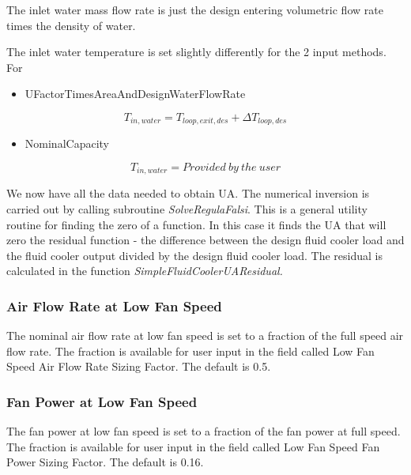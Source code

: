 The inlet water mass flow rate is just the design entering volumetric flow rate times the density of water.

The inlet water temperature is set slightly differently for the 2 input methods. For

\begin{itemize}
\tightlist
\item
  UFactorTimesAreaAndDesignWaterFlowRate
\end{itemize}

\begin{equation}
{T_{in,water}} = {T_{loop,exit,des}} + \Delta {T_{loop,des}}
\end{equation}

\begin{itemize}
\tightlist
\item
  NominalCapacity
\end{itemize}

\begin{equation}
{T_{in,water}} = Provided~by~the~user
\end{equation}

We now have all the data needed to obtain UA. The numerical inversion is carried out by calling subroutine \emph{SolveRegulaFalsi}. This is a general utility routine for finding the zero of a function. In this case it finds the UA that will zero the residual function - the difference between the design fluid cooler load and the fluid cooler output divided by the design fluid cooler load. The residual is calculated in the function \emph{SimpleFluidCoolerUAResidual.}

\subsubsection{Air Flow Rate at Low Fan Speed}\label{air-flow-rate-at-low-fan-speed-1}

The nominal air flow rate at low fan speed is set to a fraction of the full speed air flow rate. The fraction is available for user input in the field called Low Fan Speed Air Flow Rate Sizing Factor. The default is 0.5.

\subsubsection{Fan Power at Low Fan Speed}\label{fan-power-at-low-fan-speed-1}

The fan power at low fan speed is set to a fraction of the fan power at full speed. The fraction is available for user input in the field called Low Fan Speed Fan Power Sizing Factor. The default is 0.16.

